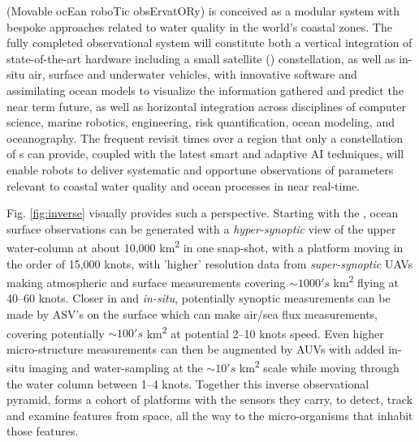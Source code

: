 \pro (Movable ocEan roboTic obsErvatORy) is conceived as a modular
system with bespoke approaches related to water quality in the world’s
coastal zones.  The fully completed observational system will
constitute both a vertical integration of state-of-the-art hardware
including a small satellite (\smle) constellation, as well as in-situ
air, surface and underwater vehicles, with innovative software and
assimilating ocean models to visualize the information gathered and
predict the near term future, as well as horizontal integration across
disciplines of computer science, marine robotics, engineering, risk
quantification, ocean modeling, and oceanography. The frequent revisit
times over a region that only a constellation of \smle s can provide,
coupled with the latest smart and adaptive AI techniques, will enable
robots to deliver systematic and opportune observations of parameters
relevant to coastal water quality and ocean processes in near
real-time.

Fig. \ref{fig:inverse} visually provides such a perspective. Starting
with the \smle, ocean surface observations can be generated with a
\emph{hyper-synoptic} view of the upper water-column at about 10,000
km\textsuperscript{2} in one snap-shot, with a platform moving in the
order of 15,000 knots, with 'higher' resolution data from
\emph{super-synoptic} UAVs making atmospheric and surface measurements
covering $\sim 1000's$ km\textsuperscript{2} flying at 40--60
knots. Closer in and \emph{in-situ}, potentially synoptic measurements
can be made by ASV's on the surface which can make air/sea flux
measurements, covering potentially $\sim 100's$ km\textsuperscript{2} at
potential 2--10 knots speed. Even higher micro-structure measurements
can then be augmented by AUVs with added in-situ imaging and
water-sampling at the $\sim 10's$ km\textsuperscript{2} scale while
moving through the water column between 1--4 knots. Together this
inverse observational pyramid, forms a cohort of platforms with the
sensors they carry, to detect, track and examine features from space,
all the way to the micro-organisms that inhabit those features.


